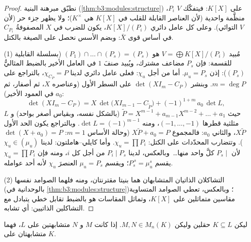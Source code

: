 \begin{proof}
نطبّق مبرهنة البنية (\cref{thm:b3:modules:structure}) على 
$K[X]$: فيتفكّك   $V$  $P_i$، منظَّمة
واحدية (لأن العناصر القابلة للقلب في $K[X]$ هي $K^\times$)؛ ولا
يظهر جزء حر (لأن $V$ التوائي). وعلى كل عامل دائري $K[X]/(P_i)$،
يكون للضرب في $X$ المصفوفةُ $C_{P_i}$ في أساس قوى $\bar X$: وبضم
الأسس نحصل على الصيغة بالكتل.

(1) مُبيد $V = \bigoplus K[X]/(P_i)$ هو $(P_1)\cap
\dots\cap(P_s) = (P_s)$ (بسلسلة القابلية للقسمة: فإن $P_s$
مضاعف مشترك، ويُبيد صنفَ $1$ في العامل الأخير بالضبط المثاليُّ
$(P_s)$): إذن $\mu_u = P_s$. أما من أجل $\chi_u$: فعلى عامل دائري
لدينا $\chi_{C_P} = P$، بالتراجع على $m = \deg P$. وبنشر $\det(XI_m - C_P)$
على السطر الأول (وعناصره $X$، ثم أصفار، ثم $a_0$ في العمود
الأخير):
\[
\det(XI_m - C_P) = X\,\det\bigl(XI_{m-1} - C_{\tilde P}\bigr)
+ (-1)^{1+m}\,a_0\,\det L ,
\]
حيث $\tilde P = X^{m-1} + a_{m-1}X^{m-2} + \dots + a_1$ (بالشكل نفسه، وبقياس أصغر بواحد) و $L$ مثلثية قطرها
$(-1, \dots, -1)$، ومنه $\det L = (-1)^{m-1}$. وبالتراجع يكون الحد الأول $X\tilde P$،
والثاني $a_0$: فالمجموع $X\tilde P + a_0 = P$ (وحالة الأساس $m=1$: $\det(X + a_0) = P$).
وتتضارب المحدّدات على الكتل: $\chi_u = \prod P_i$. وأما كايلي--هاملتون:
لدينا $\chi_u \in (\mu_u)$ لأن $P_s \mid$ كلَّ واحد منها\dots\ وبالعكس، لدينا
$P_i \mid P_s$ من أجل كل $i$، ومنه فإن $\chi_u = \prod P_i$ يقسم $P_s^{\,s} = \mu_u^s$؛ ويقسم $\mu_u =
P_s$
العنصرَ $\chi_u$ لأنه أحد عوامله.

(2) التشاكلان الذاتيان المتشابهان هما بنيتا  مقترنتان، ومنه
فلهما الصوامد نفسها (بالوحدانية في \cref{thm:b3:modules:structure})؛ وبالعكس، تعطي
الصوامد المتساوية مقاسين متماثلين على $K[X]$، وتماثل المقاسات هو
بالضبط تقابل خطي يتبادل مع التشاكلين الذاتيين: أي تشابه.
\end{proof}

\begin{corollary}
\label{cor:b3:modules:descent}
ليكن $K \subseteq L$ حقلين وليكن $M, N \in M_n(K)$. إذا كانت $M$ و $N$
متشابهتين على $L$، فهما متشابهتان على $K$.
\end{corollary}

